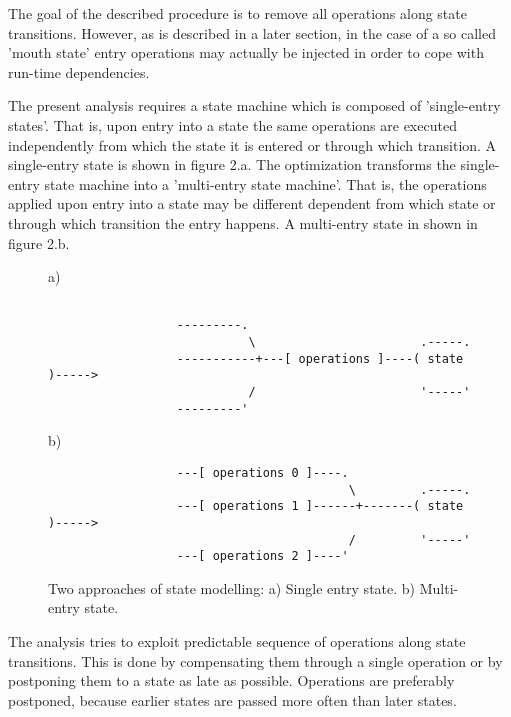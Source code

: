 \documentclass[12pt,a4paper]{scrartcl}
\begin{document}
     
The goal of the described procedure is to remove all operations along state
transitions. However, as is described in a later section, in the case of a 
so called 'mouth state' entry operations may actually be injected in order
to cope with run-time dependencies.

The present analysis requires a state machine which is composed of
'single-entry states'. That is, upon entry into a state the same operations are
executed independently from which the state it is entered or through which
transition.  A single-entry state is shown in figure 2.a. The optimization
transforms the single-entry state machine into a 'multi-entry state machine'.
That is, the operations applied upon entry into a state may be different
dependent from which state or through which transition the entry happens.  A
multi-entry state in shown in figure 2.b.

\begin{figure}[htbp] \leavevmode
a)

\begin{verbatim}
     
                  ---------.
                            \                       .-----.
                  -----------+---[ operations ]----( state )----->   
                            /                       '-----'
                  ---------'       
\end{verbatim}
     
b)
     
\begin{verbatim}
                  ---[ operations 0 ]----.
                                          \         .-----.
                  ---[ operations 1 ]------+-------( state )----->  
                                          /         '-----'
                  ---[ operations 2 ]----'       

\end{verbatim}
\caption{Two approaches of state modelling: a) Single entry state. 
b) Multi-entry state.}
\end{figure}

The analysis tries to exploit predictable sequence of operations along state
transitions. This is done by compensating them through a single operation or by
postponing them to a state as late as possible.  Operations are preferably
postponed, because earlier states are passed more often than later states.

%
\end{document}

